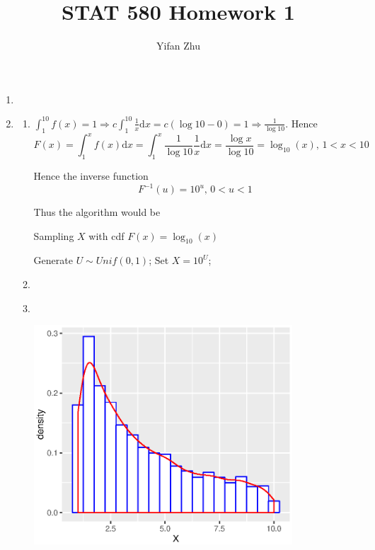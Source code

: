 \documentclass{article}
\begin{document}
	

	
	\title{STAT 580 Homework 1}
	\author{Yifan Zhu}
	\maketitle
	
	\begin{enumerate}[leftmargin = 0 em, label = \arabic*., font = \bfseries]
	\item 
	

	
	\item 
	\begin{enumerate}
		\item 
		$\int_{1}^{10} f(x) = 1 \Rightarrow c \int_{1}^{10} \frac{1}{x} \mathrm{d}x= c (\log 10 - 0) = 1 \Rightarrow \frac{1}{\log 10}$. Hence
		\[F(x) = \int_{1}^x f(x) \mathrm{d}x = \int_{1}^x \frac{1}{\log 10} \frac{1}{x} \mathrm{d}x = \frac{\log x}{\log 10} = \log_{10} (x) ,\, 1 < x < 10\]

		Hence the inverse function
		\[F^{-1}(u) = 10^u,\, 0<u<1\]

		Thus the algorithm would be
		\begin{algorithm}
			\caption{Sampling $X$ with cdf $F(x) = \log_{10}(x)$}
			\begin{algorithmic}[1]
				\State Generate $U \sim Unif(0,1)$;
				\State Set $X = 10^U$;
			\end{algorithmic}
		\end{algorithm}

		\item 

		\ 

		

		\item 

		\ 
		
		
		\includegraphics[width = 0.8\textwidth]{p2density.eps}


\end{enumerate}
\end{enumerate}
\end{document}
